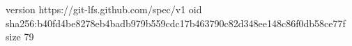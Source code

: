 version https://git-lfs.github.com/spec/v1
oid sha256:b40fd4be8278eb4badb979b559cdc17b463790c82d348ee148c86f0db58ce77f
size 79
